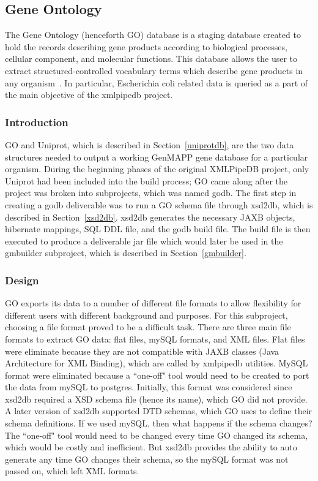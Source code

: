 %

 
\subsection{Gene Ontology}
\label{godb}
The Gene Ontology (henceforth GO) database is a staging database created to hold the records describing gene products according to biological processes,
cellular component, and molecular functions. This database allows the user to extract structured-controlled vocabulary terms
which describe gene products in any organism~\cite{geneontologyWeb}. In particular, Escherichia coli related data is queried as a part of the main
objective of the xmlpipedb project.

\subsubsection{Introduction}
GO and Uniprot, which is described in Section~\ref{uniprotdb}, are the two data structures needed to output a
working GenMAPP gene database for a particular organism. During the beginning phases of the original XMLPipeDB project,
only Uniprot had been included into the build process; GO came along after the project was broken into subprojects,
which was named godb. The first step in creating a godb deliverable was to run a GO schema file
through xsd2db, which is described in Section~\ref{xsd2db}. xsd2db generates the necessary JAXB
objects, hibernate mappings, SQL DDL file, and the godb build file. The build file is then executed
to produce a deliverable jar file which  would later be used in the gmbuilder
subproject, which is described in Section~\ref{gmbuilder}.


\subsubsection{Design}
\label{godtd}
GO exports its data to a number of different file formats to allow flexibility for different users with
different background and purposes. For this subproject, choosing a file format proved to be a difficult task.
There are three main file formats to extract GO data: flat files, mySQL formats, and XML files. Flat files
were eliminate because they are not compatible with JAXB classes (Java Architecture for XML Binding), which  are called by
xmlpipedb utilities. MySQL format were eliminated because a ``one-off" tool would need
to be created to port the data from mySQL to postgres. Initially, this format was considered since xsd2db
required a XSD
schema file (hence its name), which GO did not provide. A later version of xsd2db supported DTD schemas, which GO uses to define their
schema definitions. If we used mySQL, then what happens if the schema changes? The ``one-off" tool would need to be changed every
time GO changed its schema, which would be costly and inefficient. But xsd2db provides the ability to auto generate any time GO changes
their schema, so the mySQL format was not passed on, which left XML formats.

